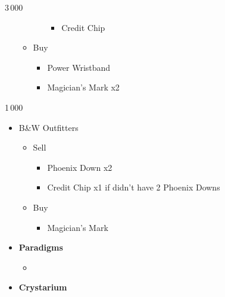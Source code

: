 \begin{paracol}{2}
\begin{shop}{3\,000}
\begin{itemize}
\begin{itemize}
\begin{itemize}
\begin{itemize}
						                  \item Credit Chip
					                  \end{itemize}
				            \end{itemize}
				      \item Buy
				            \begin{itemize}
					            \item Power Wristband
					            \item Magician's Mark x2
				            \end{itemize}
			      \end{itemize}
		\end{itemize}
	\end{shop}
	\switchcolumn
	\begin{shop}{1\,000}
\begin{itemize}
    \item B\&W Outfitters
    \begin{itemize}
        \item Sell
        \begin{itemize}
            \item Phoenix Down x2
            \item Credit Chip x1 if didn't have 2 Phoenix Downs
        \end{itemize}
        \item Buy
        \begin{itemize}
            \item Magician's Mark
        \end{itemize}
    \end{itemize}
\end{itemize}
\end{shop}
\switchcolumn*
	\begin{menu}
		\begin{itemize}
			\item \textbf{Paradigms}
			      \begin{itemize}
				      \item {}%
				            {\paradigmline{(\rav)}{\rav}{\rav}}%
				            {\paradigmline{\com}{\sen}{\med}}%
				            {\paradigmline[3]{\textit{[\com]}}{\textit{\com}}{\textit{\rav}}}%
				            {\paradigmline{[\com]}{\com}{\rav}}
			      \end{itemize}
			\item \textbf{Crystarium}
			      \begin{itemize}

\end{itemize}
\end{itemize}
\end{menu}
\end{paracol}
